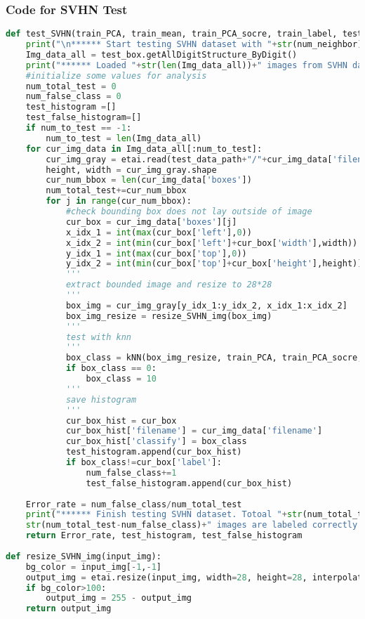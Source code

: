 \documentclass[12pt]{article}
\begin{document}
\subsubsection*{Code for SVHN Test}
\begin{lstlisting}[language=Python]
def test_SVHN(train_PCA, train_mean, train_PCA_socre, train_label, test_box, test_data_path, num_neighbor, num_to_test):
	print("\n****** Start testing SVHN dataset with "+str(num_neighbor)+" nearest neighbors ******")
	Img_data_all = test_box.getAllDigitStructure_ByDigit()
	print("****** Loaded "+str(len(Img_data_all))+" images from SVHN dataset ******")
	#initialize some values for analysis
	num_total_test = 0
	num_false_class = 0
	test_histogram =[]
	test_false_histogram=[]
	if num_to_test == -1:
		num_to_test = len(Img_data_all)
	for cur_img_data in Img_data_all[:num_to_test]:
		cur_img_gray = etai.read(test_data_path+"/"+cur_img_data['filename'], flag=cv2.IMREAD_GRAYSCALE)
		height, width = cur_img_gray.shape
		cur_num_bbox = len(cur_img_data['boxes'])
		num_total_test+=cur_num_bbox
		for j in range(cur_num_bbox):
			#check bounding box does not lay outside of image
			cur_box = cur_img_data['boxes'][j]
			x_idx_1 = int(max(cur_box['left'],0))
			x_idx_2 = int(min(cur_box['left']+cur_box['width'],width))
			y_idx_1 = int(max(cur_box['top'],0))
			y_idx_2 = int(min(cur_box['top']+cur_box['height'],height))
			'''
			extract bounded image and resize to 28*28
			'''
			box_img = cur_img_gray[y_idx_1:y_idx_2, x_idx_1:x_idx_2]
			box_img_resize = resize_SVHN_img(box_img)
			'''
			test with knn
			'''
			box_class = kNN(box_img_resize, train_PCA, train_PCA_socre, train_mean, train_label, num_neighbor)
			if box_class == 0:
				box_class = 10
			'''
			save histogram
			'''
			cur_box_hist = cur_box
			cur_box_hist['filename'] = cur_img_data['filename']
			cur_box_hist['classify'] = box_class
			test_histogram.append(cur_box_hist)
			if box_class!=cur_box['label']:
				num_false_class+=1
				test_false_histogram.append(cur_box_hist)
	
	Error_rate = num_false_class/num_total_test
	print("****** Finish testing SVHN dataset. Totoal "+str(num_total_test)+" images tested. "+
	str(num_total_test-num_false_class)+" images are labeled correctly. Error rate = "+str(Error_rate*100)+"% ******")
	return Error_rate, test_histogram, test_false_histogram
		
def resize_SVHN_img(input_img):
	bg_color = input_img[-1,-1]
	output_img = etai.resize(input_img, width=28, height=28, interpolation=cv2.INTER_AREA)
	if bg_color>100:
		output_img = 255 - output_img
	return output_img
\end{lstlisting}
\end{document}
